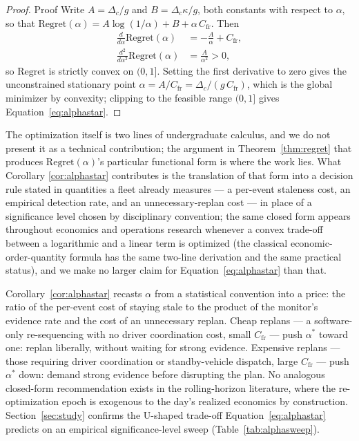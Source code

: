 \documentclass[trsc,dblanonrev]{informs4}
\begin{document}
\begin{proof}{Proof}
Write $A = \Delta_c/g$ and $B = \Delta_c \kappa / g$, both constants
with respect to $\alpha$, so that
$\mathrm{Regret}(\alpha) = A\log(1/\alpha) + B + \alpha\, C_{\mathrm{fr}}$.
Then
\begin{align*}
\frac{d}{d\alpha}\mathrm{Regret}(\alpha) &= -\frac{A}{\alpha} +
C_{\mathrm{fr}}, \\
\frac{d^2}{d\alpha^2}\mathrm{Regret}(\alpha) &= \frac{A}{\alpha^2} > 0,
\end{align*}
so $\mathrm{Regret}$ is strictly convex on $(0,1]$. Setting the first
derivative to zero gives the unconstrained stationary point $\alpha =
A/C_{\mathrm{fr}} = \Delta_c/(g\,C_{\mathrm{fr}})$, which is the global
minimizer by convexity; clipping to the feasible range $(0,1]$ gives
Equation~\eqref{eq:alphastar}. \Halmos
\end{proof}

The optimization itself is two lines of undergraduate calculus, and we
do not present it as a technical contribution; the argument in
Theorem~\ref{thm:regret} that produces $\mathrm{Regret}(\alpha)$'s
particular functional form is where the work lies. What Corollary
\ref{cor:alphastar} contributes is the translation of that form into a
decision rule stated in quantities a fleet already measures --- a
per-event staleness cost, an empirical detection rate, and an
unnecessary-replan cost --- in place of a significance level chosen by
disciplinary convention; the same closed form appears throughout
economics and operations research whenever a convex trade-off between a
logarithmic and a linear term is optimized (the classical
economic-order-quantity formula has the same two-line derivation and
the same practical status), and we make no larger claim for
Equation~\eqref{eq:alphastar} than that.

Corollary~\ref{cor:alphastar} recasts $\alpha$ from a statistical
convention into a price: the ratio of the per-event cost of staying
stale to the product of the monitor's evidence rate and the cost of an
unnecessary replan. Cheap replans --- a software-only re-sequencing
with no driver coordination cost, small $C_{\mathrm{fr}}$ --- push
$\alpha^\ast$ toward one: replan liberally, without waiting for strong
evidence. Expensive replans --- those requiring driver coordination or
standby-vehicle dispatch, large $C_{\mathrm{fr}}$ --- push
$\alpha^\ast$ down: demand strong evidence before disrupting the plan.
No analogous closed-form recommendation exists in the rolling-horizon
literature, where the re-optimization epoch is exogenous to the day's
realized economics by construction. Section~\ref{sec:study} confirms
the U-shaped trade-off Equation~\eqref{eq:alphastar} predicts on an
empirical significance-level sweep (Table~\ref{tab:alphasweep}).
\end{document}
